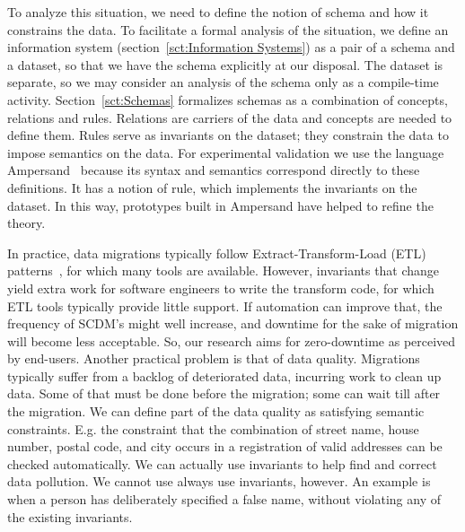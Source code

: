 \documentclass[runningheads]{llncs}
\begin{document}
   To analyze this situation, we need to define the notion of schema and how it constrains the data.
   To facilitate a formal analysis of the situation,
   we define an information system (section~\ref{sct:Information Systems}) as a pair of a schema and a dataset,
   so that we have the schema explicitly at our disposal.
   The dataset is separate, so we may consider an analysis of the schema only as a compile-time activity.
   Section~\ref{sct:Schemas} formalizes schemas as a combination of concepts, relations and rules.
   Relations are carriers of the data and concepts are needed to define them.
   Rules serve as invariants on the dataset; they constrain the data to impose semantics on the data.
   For experimental validation we use the language Ampersand~\cite{JoostenRAMiCS2017,Joosten-JLAMP2018}
   because its syntax and semantics correspond directly to these definitions.
   It has a notion of rule, which implements the invariants on the dataset.
   In this way, prototypes built in Ampersand have helped to refine the theory.

   In practice, data migrations typically follow Extract-Transform-Load (ETL) patterns~\cite{Theodorou2017},
   for which many tools are available.
   However, invariants that change yield extra work for software engineers to write the transform code,
   for which ETL tools typically provide little support.
   If automation can improve that, the frequency of SCDM's might well increase,
   and downtime for the sake of migration will become less acceptable.
   So, our research aims for zero-downtime as perceived by end-users.
   Another practical problem is that of data quality.
   Migrations typically suffer from a backlog of deteriorated data, incurring work to clean up data.
   Some of that must be done before the migration; some can wait till after the migration.
   We can define part of the data quality as satisfying semantic constraints.
   E.g. the constraint that the combination of street name, house number, postal code, and city occurs in
   a registration of valid addresses can be checked automatically.
   We can actually use invariants to help find and correct data pollution.
   We cannot use always use invariants, however.
   An example is when a person has deliberately specified a false name, without violating any of the existing invariants.
\end{document}

